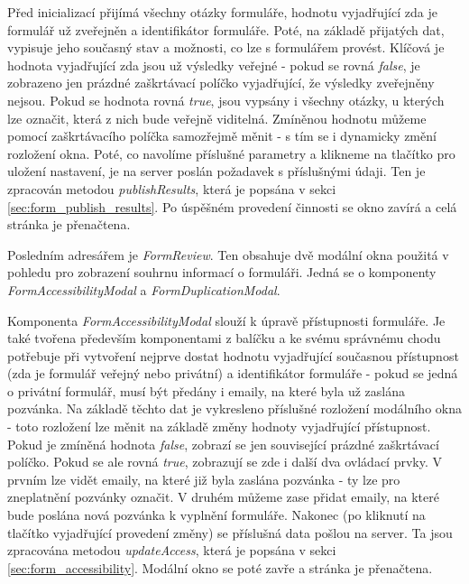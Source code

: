 			Před inicializací přijímá všechny otázky formuláře, hodnotu vyjadřující zda je formulář už zveřejněn a identifikátor formuláře. Poté, na základě přijatých dat, vypisuje jeho současný stav a možnosti, co lze s formulářem provést. Klíčová je hodnota vyjadřující zda jsou už výsledky veřejné - pokud se rovná \textit{false}, je zobrazeno jen prázdné zaškrtávací políčko vyjadřující, že výsledky zveřejněny nejsou. Pokud se hodnota rovná \textit{true}, jsou vypsány i všechny otázky, u kterých lze označit, která z nich bude veřejně viditelná. Zmíněnou hodnotu můžeme pomocí zaškrtávacího políčka samozřejmě měnit - s tím se i dynamicky změní rozložení okna. Poté, co navolíme příslušné parametry a klikneme na tlačítko pro uložení nastavení, je na server poslán požadavek s příslušnými údaji. Ten je zpracován metodou \textit{publishResults}, která je popsána v sekci \ref{sec:form_publish_results}. Po úspěšném provedení činnosti se okno zavírá a celá stránka je přenačtena.
			
			\label{sec:modalni_okna_man_form}
			Posledním adresářem je \textit{FormReview}. Ten obsahuje dvě modální okna použitá v pohledu pro zobrazení souhrnu informací o formuláři. Jedná se o komponenty \textit{FormAccessibilityModal} a \textit{FormDuplicationModal}.
			
			Komponenta \textit{FormAccessibilityModal} slouží k úpravě přístupnosti formuláře. Je také tvořena především komponentami z balíčku  a ke svému správnému chodu potřebuje při vytvoření nejprve dostat hodnotu vyjadřující současnou přístupnost (zda je formulář veřejný nebo privátní) a identifikátor formuláře - pokud se jedná o privátní formulář, musí být předány i emaily, na které byla už zaslána pozvánka. Na základě těchto dat je vykresleno příslušné rozložení modálního okna - toto rozložení lze měnit na základě změny hodnoty vyjadřující přístupnost. Pokud je zmíněná hodnota \textit{false}, zobrazí se jen související prázdné zaškrtávací políčko. Pokud se ale rovná \textit{true}, zobrazují se zde i další dva ovládací prvky. V prvním lze vidět emaily, na které již byla zaslána pozvánka - ty lze pro zneplatnění pozvánky označit. V druhém můžeme zase přidat emaily, na které bude poslána nová pozvánka k vyplnění formuláře. Nakonec (po kliknutí na tlačítko vyjadřující provedení změny) se příslušná data pošlou na server. Ta jsou zpracována metodou \textit{updateAccess}, která je popsána v sekci \ref{sec:form_accessibility}. Modální okno se poté zavře a stránka je přenačtena.
			
